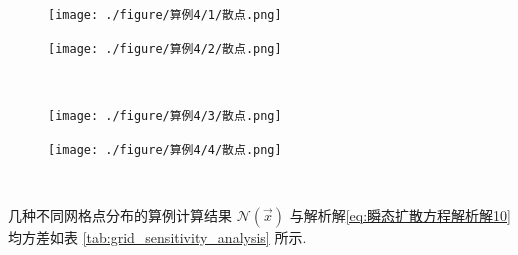 \documentclass{Sichuan Normal University}
\begin{document}
\begin{figure}[H]
    \centering
    \begin{minipage}[c]{0.48\textwidth}
    \centering
    \texttt{[image: ./figure/算例4/1/散点.png]}
    \end{minipage}
    \hspace{0.02\textwidth}
    \begin{minipage}[c]{0.48\textwidth}
    \centering
    \texttt{[image: ./figure/算例4/2/散点.png]}
    \end{minipage}\\[3mm]
    \begin{minipage}[t]{0.48\textwidth}
    \centering
    \label{fig:算例1网格点分布图}
    \end{minipage}
    \hspace{0.02\textwidth}
    \begin{minipage}[t]{0.48\textwidth}
    \centering
    \label{fig:算例2网格点分布图}
    \end{minipage}
    \centering
    \begin{minipage}[c]{0.48\textwidth}
    \centering
    \texttt{[image: ./figure/算例4/3/散点.png]}
    \end{minipage}
    \hspace{0.02\textwidth}
    \begin{minipage}[c]{0.48\textwidth}
    \centering
    \texttt{[image: ./figure/算例4/4/散点.png]}
    \end{minipage}\\[3mm]
    \begin{minipage}[t]{0.48\textwidth}
    \centering
    \label{fig:算例3网格点分布图}
    \end{minipage}
    \hspace{0.02\textwidth}
    \begin{minipage}[t]{0.48\textwidth}
    \centering
    \label{fig:算例4网格点分布图}
    \end{minipage}
\end{figure}

几种不同网格点分布的算例计算结果 $\mathcal{N}(\vec{x})$ 与解析解\eqref{eq:瞬态扩散方程解析解10} 均方差如表 \ref{tab:grid_sensitivity_analysis} 所示.
\end{document}
